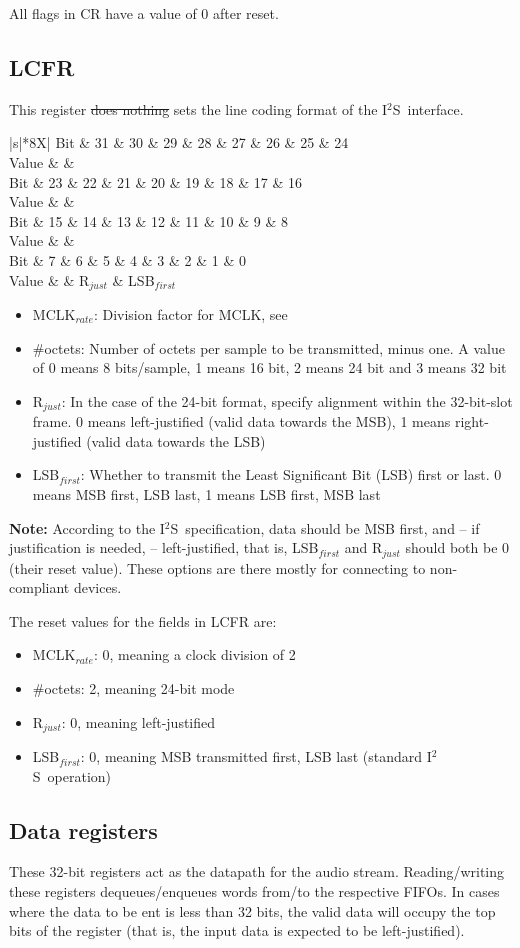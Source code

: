 \documentclass{datasheet}
\newcommand{\iis}{I$^2$S}
\newcommand{\regs}[4]{\begin{tabularx}{\textwidth}{|s|*{8}{X|}}
		\hline
		Bit   & 31 & 30 & 29 & 28 & 27 & 26 & 25 & 24\\\hline
		Value & #1\\\hline\hline
		Bit   & 23 & 22 & 21 & 20 & 19 & 18 & 17 & 16\\\hline
		Value & #2\\\hline\hline
		Bit   & 15 & 14 & 13 & 12 & 11 & 10 &  9 &  8\\\hline
		Value & #3\\\hline\hline
		Bit   &  7 &  6 &  5 &  4 &  3 &  2 &  1 &  0\\\hline
		Value & #4\\\hline
\end{tabularx}}
\newcommand{\rzeroes}[1]{\multicolumn{#1}{c|}{0}}
\newcommand{\note}[1]{\colorbox[HTML]{eeeeff}{
		\begin{minipage}
			{\textwidth}{\Large\bfseries Note:} #1
		\end{minipage}
}}
\begin{document}
	All flags in CR have a value of 0 after reset.

	\subsection{LCFR}\label{sec:reg:lcfr}
	This register \st{does nothing} sets the line coding format of the \iis\ interface.

	\regs
		{\rzeroes{5} & }
		{\rzeroes{5} & \multicolumn{3}{c|}{SCLK$_{rate}$}}
		{\rzeroes{5} & \multicolumn{3}{c|}{\#octets}}
		{\rzeroes{6} & R$_{just}$ & LSB$_{first}$}

	\begin{itemize}
		\item MCLK$_{rate}$: Division factor for MCLK, see 
		\item \#octets: Number of octets per sample to be transmitted, minus one. A value of 0 means 8 bits/sample, 1 means 16 bit, 2 means 24 bit and 3 means 32 bit
		\item R$_{just}$: In the case of the 24-bit format, specify alignment within the 32-bit-slot frame. 0 means left-justified (valid data towards the MSB), 1 means right-justified (valid data towards the LSB)
		\item LSB$_{first}$: Whether to transmit the Least Significant Bit (LSB) first or last. 0 means MSB first, LSB last, 1 means LSB first, MSB last
	\end{itemize}
	\note{According to the \iis\ specification\cite{i2s-spec}, data should be MSB first, and -- if justification is needed, -- left-justified, that is, LSB$_{first}$ and R$_{just}$ should both be 0 (their reset value). These options are there mostly for connecting to non-compliant devices.}

	The reset values for the fields in LCFR are:
	\begin{itemize}
		\item MCLK$_{rate}$: 0, meaning a clock division of 2
		\item \#octets: 2, meaning 24-bit mode
		\item R$_{just}$: 0, meaning left-justified
		\item LSB$_{first}$: 0, meaning MSB transmitted first, LSB last (standard \iis\ operation)
	\end{itemize}

	\subsection{Data registers}
	These 32-bit registers act as the datapath for the audio stream. Reading/writing these registers dequeues/enqueues words from/to the respective FIFOs. In cases where the data to be ent is less than 32 bits, the valid data will occupy the top bits of the register (that is, the input data is expected to be left-justified).
\end{document}
